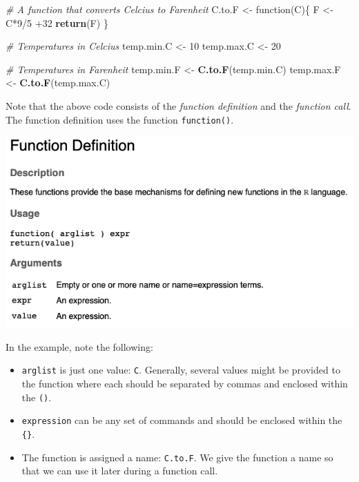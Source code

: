 \documentclass[]{book}
\newenvironment{Shaded}{\begin{snugshade}}{\end{snugshade}}
\newcommand{\KeywordTok}[1]{\textcolor[rgb]{0.13,0.29,0.53}{\textbf{{#1}}}}
\newcommand{\DecValTok}[1]{\textcolor[rgb]{0.00,0.00,0.81}{{#1}}}
\newcommand{\StringTok}[1]{\textcolor[rgb]{0.31,0.60,0.02}{{#1}}}
\newcommand{\CommentTok}[1]{\textcolor[rgb]{0.56,0.35,0.01}{\textit{{#1}}}}
\newcommand{\NormalTok}[1]{{#1}}
\begin{document}
\begin{Shaded}
\begin{Highlighting}[]
\CommentTok{# A function that converts Celcius to Farenheit}
\NormalTok{C.to.F <-}\StringTok{ }\NormalTok{function(C)\{}
  \NormalTok{F <-}\StringTok{ }\NormalTok{C*}\DecValTok{9}\NormalTok{/}\DecValTok{5} \NormalTok{+}\DecValTok{32}
  \KeywordTok{return}\NormalTok{(F)}
\NormalTok{\}}

\CommentTok{# Temperatures in Celcius}
\NormalTok{temp.min.C <-}\StringTok{ }\DecValTok{10}
\NormalTok{temp.max.C <-}\StringTok{ }\DecValTok{20}

\CommentTok{# Temperatures in Farenheit}
\NormalTok{temp.min.F <-}\StringTok{ }\KeywordTok{C.to.F}\NormalTok{(temp.min.C)}
\NormalTok{temp.max.F <-}\StringTok{ }\KeywordTok{C.to.F}\NormalTok{(temp.max.C)}
\end{Highlighting}
\end{Shaded}

Note that the above code consists of the \emph{function definition} and
the \emph{function call}. The function definition uses the function
\texttt{function()}.

\includegraphics[width=1.2\linewidth]{figures/function}

In the example, note the following:

\begin{itemize}
\item
  \texttt{arglist} is just one value: \texttt{C}. Generally, several
  values might be provided to the function where each should be
  separated by commas and enclosed within the \texttt{()}.
\item
  \texttt{expression} can be any set of commands and should be enclosed
  within the \texttt{\{\}}.
\item
  The function is assigned a name: \texttt{C.to.F}. We give the function
  a name so that we can use it later during a function call.
\end{itemize}
\end{document}
